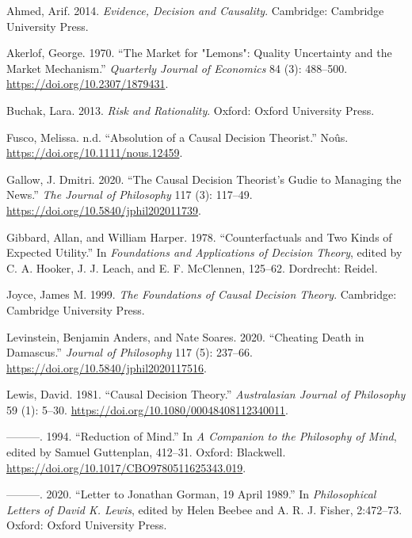 \documentclass[
  11pt,
  letterpaper,
  DIV=11,
  numbers=noendperiod,
  oneside]{scrartcl}
\newlength{\cslhangindent}
\newenvironment{CSLReferences}[2] %
 {\begin{list}{}{%
  \setlength{\itemindent}{0pt}
  \setlength{\leftmargin}{0pt}
  \setlength{\parsep}{0pt}
  \ifodd #1
   \setlength{\leftmargin}{\cslhangindent}
   \setlength{\itemindent}{-1\cslhangindent}
  \fi
  \setlength{\itemsep}{#2\baselineskip}}}
 {\end{list}}
\begin{document}
\label{refs}
\begin{CSLReferences}{1}{0}
Ahmed, Arif. 2014. \emph{Evidence, Decision and Causality}. Cambridge:
{C}ambridge {U}niversity {P}ress.

Akerlof, George. 1970. {``The Market for "Lemons": Quality Uncertainty
and the Market Mechanism.''} \emph{Quarterly Journal of Economics} 84
(3): 488--500. \url{https://doi.org/10.2307/1879431}.

Buchak, Lara. 2013. \emph{Risk and Rationality}. Oxford: Oxford
University Press.

Fusco, Melissa. n.d. {``Absolution of a Causal Decision Theorist.''}
No{û}s. \url{https://doi.org/10.1111/nous.12459}.

Gallow, J. Dmitri. 2020. {``The Causal Decision Theorist's Gudie to
Managing the News.''} \emph{The Journal of Philosophy} 117 (3): 117--49.
\url{https://doi.org/10.5840/jphil202011739}.

Gibbard, Allan, and William Harper. 1978. {``Counterfactuals and Two
Kinds of Expected Utility.''} In \emph{Foundations and Applications of
Decision Theory}, edited by C. A. Hooker, J. J. Leach, and E. F.
McClennen, 125--62. Dordrecht: Reidel.

Joyce, James M. 1999. \emph{The Foundations of Causal Decision Theory}.
Cambridge: Cambridge University Press.

Levinstein, Benjamin Anders, and Nate Soares. 2020. {``Cheating Death in
Damascus.''} \emph{Journal of Philosophy} 117 (5): 237--66.
\url{https://doi.org/10.5840/jphil2020117516}.

Lewis, David. 1981. {``Causal Decision Theory.''} \emph{Australasian
Journal of Philosophy} 59 (1): 5--30.
\url{https://doi.org/10.1080/00048408112340011}.

---------. 1994. {``Reduction of Mind.''} In \emph{A Companion to the
Philosophy of Mind}, edited by Samuel Guttenplan, 412--31. Oxford:
Blackwell. \url{https://doi.org/10.1017/CBO9780511625343.019}.

---------. 2020. {``Letter to Jonathan Gorman, 19 April 1989.''} In
\emph{Philosophical Letters of David {K}. Lewis}, edited by Helen Beebee
and A. R. J. Fisher, 2:472--73. Oxford: Oxford University Press.


\end{CSLReferences}
\end{document}
